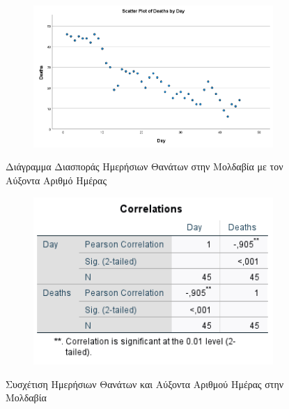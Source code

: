 \documentclass{article}
\begin{document}
     \begin{figure}[H]
        \centering
        \begin{adjustbox}{center}
        	\begin{subfigure}[c]{1\textwidth}    
        		\includegraphics[width=1\textwidth,height=\textheight,keepaspectratio]{media/2/scatterplot_deaths.png}
        	\end{subfigure}%
        \end{adjustbox}
        \caption{Διάγραμμα Διασποράς Ημερήσιων Θανάτων στην Μολδαβία με τον Αύξοντα Αριθμό Ημέρας}
    \label{deaths_scatter}
    \end{figure}
    
    \begin{figure}[H]
        \centering
        \begin{adjustbox}{center}
        	\begin{subfigure}[c]{1\textwidth}    
        		\includegraphics[width=1\textwidth,height=\textheight,keepaspectratio]{media/2/correlation_deaths.png}
        	\end{subfigure}%
        \end{adjustbox}
        \caption{Συσχέτιση Ημερήσιων Θανάτων και Αύξοντα Αριθμού Ημέρας στην Μολδαβία}
    \label{pearson_deaths}
    \end{figure}
    
\end{document}

